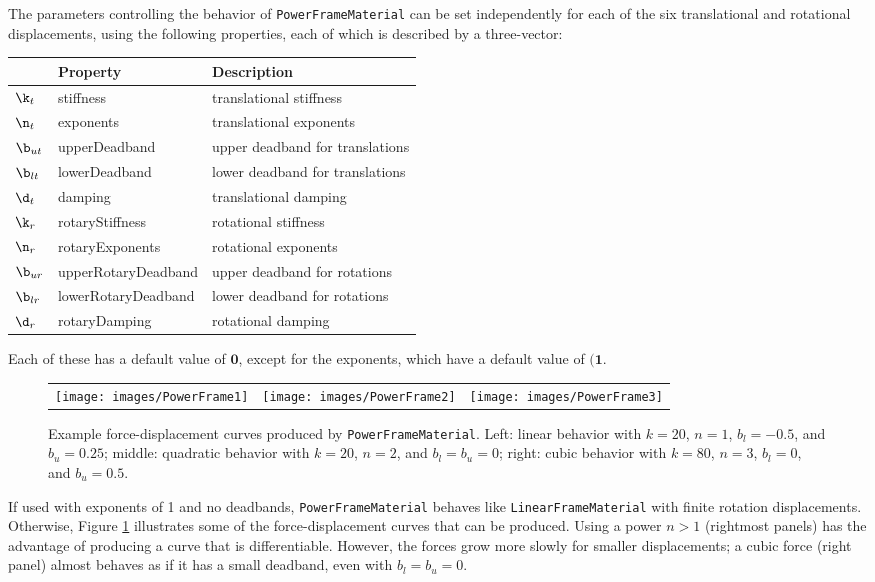 The parameters controlling the behavior of {\tt PowerFrameMaterial} can be set
independently for each of the six translational and rotational displacements,
using the following properties, each of which is described by a three-vector:
%
\begin{center}
\begin{tabular}{|l|l|l|} \hline
 & Property & Description \\
\hline
$\k_t$ & {\sf stiffness} & translational stiffness \\
$\n_t$ & {\sf exponents} & translational exponents \\
$\b_{ut}$ & {\sf upperDeadband} & upper deadband for translations \\
$\b_{lt}$ & {\sf lowerDeadband} & lower deadband for translations \\
$\d_t$ & {\sf damping} & translational damping \\
$\k_r$ & {\sf rotaryStiffness} & rotational stiffness \\
$\n_r$ & {\sf rotaryExponents} & rotational exponents \\
$\b_{ur}$ & {\sf upperRotaryDeadband} & upper deadband for rotations \\
$\b_{lr}$ & {\sf lowerRotaryDeadband} & lower deadband for rotations \\
$\d_r$ & {\sf rotaryDamping} & rotational damping \\
\hline
\end{tabular}
\end{center}
Each of these has a default value of $\mathbf{0}$, except for the exponents,
which have a default value of $(\mathbf{1}$.

\begin{figure}[ht]
\begin{center}
\begin{tabular}{ccc}
   \texttt{[image: images/PowerFrame1]}&
   \texttt{[image: images/PowerFrame2]}&
   \texttt{[image: images/PowerFrame3]}
\end{tabular}
\end{center}
\caption{Example force-displacement curves produced by {\tt PowerFrameMaterial}.
Left: linear behavior with $k=20$, $n=1$, $b_l=-0.5$, and $b_u=0.25$;
middle: quadratic behavior with $k=20$, $n=2$, and $b_l= b_u=0$;
right: cubic behavior with $k=80$, $n=3$, $b_l=0$, and $b_u=0.5$.}
\label{PowerFrameMaterial:fig}
\end{figure}

If used with exponents of 1 and no deadbands, {\tt PowerFrameMaterial} behaves
like {\tt LinearFrameMaterial} with finite rotation displacements.  Otherwise,
Figure \ref{PowerFrameMaterial:fig} illustrates some of the force-displacement
curves that can be produced. Using a power $n > 1$ (rightmost panels) has the
advantage of producing a curve that is differentiable.  However, the forces
grow more slowly for smaller displacements; a cubic force (right panel) almost
behaves as if it has a small deadband, even with $b_l = b_u = 0$.

